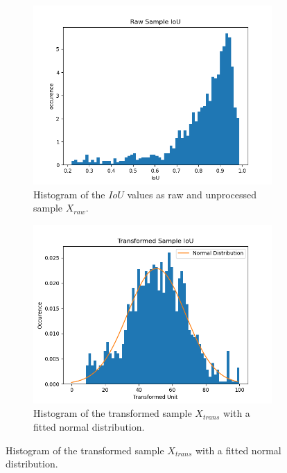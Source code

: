 \begin{figure} [h]
	\centering
	\begin{subfigure}[t]{0.3\textwidth}
		\centering
		\includegraphics[width=\textwidth]{figures/chap51_iou_raw.png}
		\caption{
			Histogram of the $ IoU $ values as raw and unprocessed sample $ X_{raw} $.
		}\label{fig:ch5:sec1:data_raw}
	\end{subfigure}
	\hfill
	\begin{subfigure}[t]{0.3\textwidth}
		\centering
		\includegraphics[width=\textwidth]{figures/chap51_iou_trans.png}
		\caption{
			Histogram of the transformed sample $ X_{trans} $ with a fitted normal distribution.
		} \label{fig:ch5:sec1:data_transformed}
	\end{subfigure}

\end{figure}
